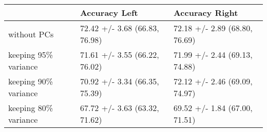 \begin{tabular}{lll}
\toprule
{} &                  Accuracy Left &                 Accuracy Right \\
\midrule
without PCs          &  72.42 +/- 3.68 (66.83, 76.98) &  72.18 +/- 2.89 (68.80, 76.69) \\
keeping 95\% variance &  71.61 +/- 3.55 (66.22, 76.02) &  71.99 +/- 2.44 (69.13, 74.88) \\
keeping 90\% variance &  70.92 +/- 3.34 (66.35, 75.39) &  72.12 +/- 2.46 (69.09, 74.97) \\
keeping 80\% variance &  67.72 +/- 3.63 (63.32, 71.62) &  69.52 +/- 1.84 (67.00, 71.51) \\
\bottomrule
\end{tabular}
